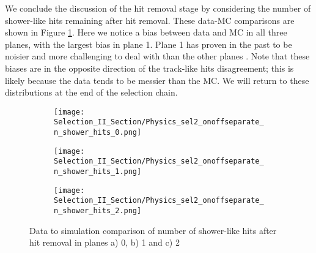 \documentclass{article}
\begin{document}
\par We conclude the discussion of the hit removal stage by considering the number of shower-like hits remaining after hit removal.  These data-MC comparisons are shown in Figure \ref{fig:datamc_showerlike_hits}.  Here we notice a bias between data and MC in all three planes, with the largest bias in plane 1. Plane 1 has proven in the past to be noisier and more challenging to deal with than the other planes \cite{bib:tracyu_vplanehits}. Note that these biases are in the opposite direction of the track-like hits disagreement; this is likely because the data tends to be messier than the MC. We will return to these distributions at the end of the selection chain.
\begin{figure}[t!]
\centering
  \begin{subfigure}[t]{0.3\textwidth}
    \centering
\texttt{[image: Selection\_II\_Section/Physics\_sel2\_onoffseparate\_n\_shower\_hits\_0.png]}
  \caption{ }
  \end{subfigure} 
  \hspace{30 mm}
  \begin{subfigure}[t]{0.3\textwidth}
    \centering
\texttt{[image: Selection\_II\_Section/Physics\_sel2\_onoffseparate\_n\_shower\_hits\_1.png]}
  \caption{ }
  \end{subfigure} 
  \hspace{30 mm}
  \begin{subfigure}[t]{0.3\textwidth}
    \centering
\texttt{[image: Selection\_II\_Section/Physics\_sel2\_onoffseparate\_n\_shower\_hits\_2.png]}
  \caption{ }
  \end{subfigure} 
\caption{ Data to simulation comparison of number of shower-like hits after hit removal in planes a) 0, b) 1 and c) 2 } 
\label{fig:datamc_showerlike_hits}
\end{figure}


\end{document}
